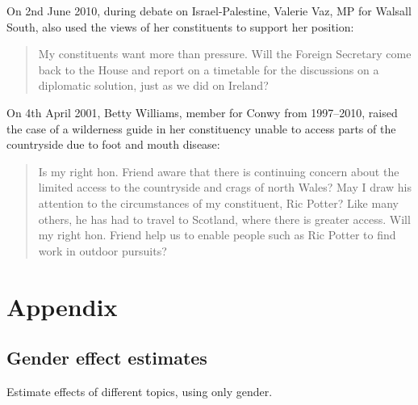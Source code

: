 \documentclass[]{article}
\theoremstyle{definition}
\theoremstyle{definition}
\theoremstyle{definition}
\theoremstyle{remark}
\begin{document}
\begin{table}[H]
\begin{table}[H]
\begin{table}[H]
\begin{table}[H]
\begin{table}[H]
\begin{table}[H]
\begin{table}[H]
\begin{table}[H]
On 2nd June 2010, during debate on Israel-Palestine, Valerie Vaz, MP for
Walsall South, also used the views of her constituents to support her
position:

\begin{quote}
My constituents want more than pressure. Will the Foreign Secretary come
back to the House and report on a timetable for the discussions on a
diplomatic solution, just as we did on Ireland?
\end{quote}

On 4th April 2001, Betty Williams, member for Conwy from 1997--2010,
raised the case of a wilderness guide in her constituency unable to
access parts of the countryside due to foot and mouth disease:

\begin{quote}
Is my right hon. Friend aware that there is continuing concern about the
limited access to the countryside and crags of north Wales? May I draw
his attention to the circumstances of my constituent, Ric Potter? Like
many others, he has had to travel to Scotland, where there is greater
access. Will my right hon. Friend help us to enable people such as Ric
Potter to find work in outdoor pursuits?
\end{quote}

\clearpage

\hypertarget{appendix}{%
\section{Appendix}\label{appendix}}

\hypertarget{gender-effect-estimates}{%
\subsection{Gender effect estimates}\label{gender-effect-estimates}}

Estimate effects of different topics, using only gender.


\end{table}
\end{table}
\end{table}
\end{table}
\end{table}
\end{table}
\end{table}
\end{table}
\end{document}
